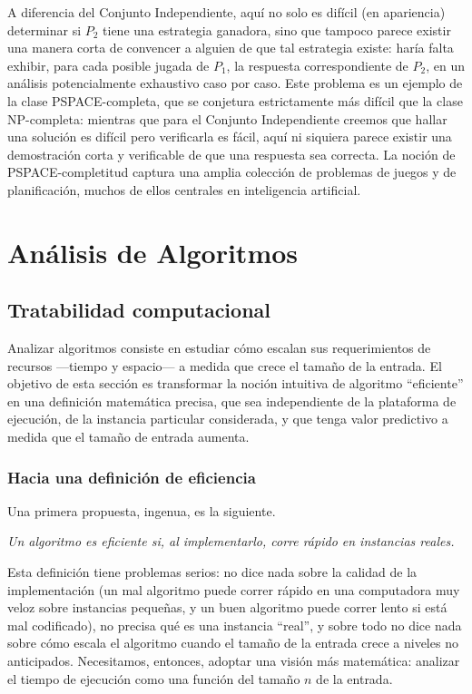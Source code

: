 \documentclass[12pt, spanish, oneside, openany]{book}
\theoremstyle{uprightplain}
\theoremstyle{definition}
\theoremstyle{remark}
\theoremstyle{definition}
\begin{document}
A diferencia del Conjunto Independiente, aquí no solo es difícil (en apariencia) determinar si $P_2$ tiene una estrategia ganadora, sino que tampoco parece existir una manera corta de convencer a alguien de que tal estrategia existe: haría falta exhibir, para cada posible jugada de $P_1$, la respuesta correspondiente de $P_2$, en un análisis potencialmente exhaustivo caso por caso. Este problema es un ejemplo de la clase PSPACE-completa, que se conjetura estrictamente más difícil que la clase NP-completa: mientras que para el Conjunto Independiente creemos que hallar una solución es difícil pero verificarla es fácil, aquí ni siquiera parece existir una demostración corta y verificable de que una respuesta sea correcta. La noción de PSPACE-completitud captura una amplia colección de problemas de juegos y de planificación, muchos de ellos centrales en inteligencia artificial.


\chapter{Análisis de Algoritmos}

\section{Tratabilidad computacional}
\label{sec:tratabilidad}

Analizar algoritmos consiste en estudiar cómo escalan sus requerimientos de recursos —tiempo y espacio— a medida que crece el tamaño de la entrada. El objetivo de esta sección es transformar la noción intuitiva de algoritmo ``eficiente'' en una definición matemática precisa, que sea independiente de la plataforma de ejecución, de la instancia particular considerada, y que tenga valor predictivo a medida que el tamaño de entrada aumenta.

\subsection{Hacia una definición de eficiencia}

Una primera propuesta, ingenua, es la siguiente.

\begin{center}
\emph{Un algoritmo es eficiente si, al implementarlo, corre rápido en instancias reales.}
\end{center}

Esta definición tiene problemas serios: no dice nada sobre la calidad de la implementación (un mal algoritmo puede correr rápido en una computadora muy veloz sobre instancias pequeñas, y un buen algoritmo puede correr lento si está mal codificado), no precisa qué es una instancia ``real'', y sobre todo no dice nada sobre cómo escala el algoritmo cuando el tamaño de la entrada crece a niveles no anticipados. Necesitamos, entonces, adoptar una visión más matemática: analizar el tiempo de ejecución como una función del tamaño $n$ de la entrada.
\end{document}
